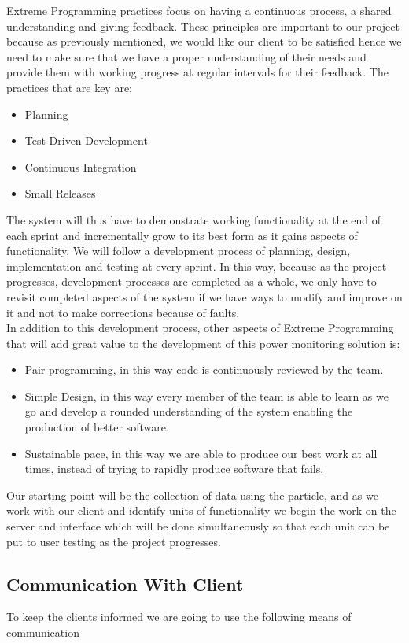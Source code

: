 \documentclass{scrartcl}
\begin{document}
Extreme Programming practices focus on having a continuous process, a shared understanding and giving feedback. These principles are important to our project because as previously mentioned, we would like our client to be satisfied hence we need to make sure that we have a proper understanding of their needs and provide them with working progress at regular intervals for their feedback. The practices that are key are:
\begin{itemize}
\item Planning
\item Test-Driven Development
\item Continuous Integration
\item Small Releases
\end{itemize}
The system will thus have to demonstrate working functionality at the end of each sprint and incrementally grow to its best form as it gains aspects of functionality. We will follow a development process of planning, design, implementation and testing at every sprint. In this way, because as the project progresses, development processes are completed as a whole, we only have to revisit completed aspects of the system if we have ways to modify and improve on it and not to make corrections because of faults.\\

In addition to this development process, other aspects of Extreme Programming that will add great value to the development of this power monitoring solution is:
\begin{itemize}
\item Pair programming, in this way code is continuously reviewed by the team.
\item Simple Design, in this way every member of the team is able to learn as we go and develop a rounded understanding of the system enabling the production of better software.
\item Sustainable pace, in this way we are able to produce our best work at all times, instead of trying to rapidly produce software that fails.
\end{itemize}
Our starting point will be the collection of data using the particle, and as we work with our client and identify units of functionality we begin the work on the server and interface which will be done simultaneously so that each unit can be put to user testing as the project progresses.
\subsection{Communication With Client}
To keep the clients informed we are going to use the following means of communication
\end{document}
